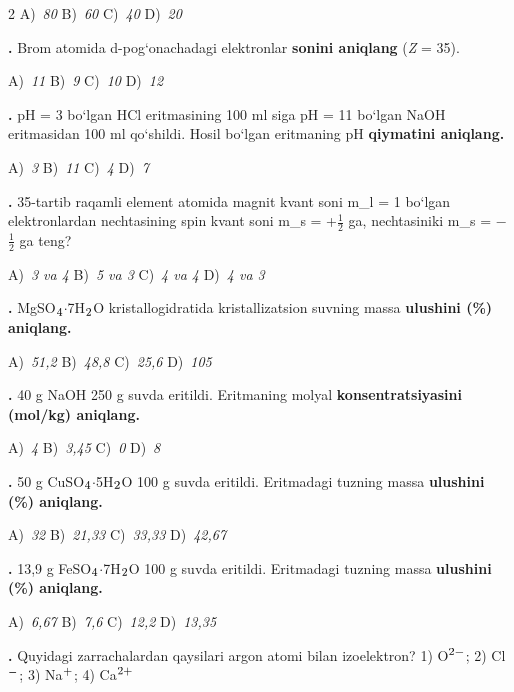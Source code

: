 \documentclass[11pt,a4paper]{article}
\renewcommand{\textsubscript}[1]{\ensuremath{_{\text{\fontsize{8}{8}\selectfont #1}}}}
\renewcommand{\textsuperscript}[1]{\ensuremath{^{\text{\fontsize{8}{8}\selectfont #1}}}}
\newcommand{\qn}[1]{\textbf{\fontsize{11.5}{13}\selectfont #1}}
\newcommand{\qsep}{\par\vspace{1pt}\noindent\rule{0pt}{0.4pt}\par\vspace{5pt}}
\begin{document}
\begin{multicols}{2}
\noindent A)~\textsl{80} \hfill B)~\textsl{60} \hfill C)~\textsl{40} \hfill D)~\textsl{20}\par
\qsep
\noindent\qn{4.} Brom atomida d-pog`onachadagi elektronlar \textbf{sonini aniqlang} (\textit{Z} = 35).

\noindent A)~\textsl{11} \hfill B)~\textsl{9} \hfill C)~\textsl{10} \hfill D)~\textsl{12}\par
\qsep
\noindent\qn{5.} pH = 3 bo`lgan HCl eritmasining 100 ml siga pH = 11 bo`lgan NaOH eritmasidan 100 ml qo`shildi. Hosil bo`lgan eritmaning pH \textbf{qiymatini aniqlang.}

\noindent A)~\textsl{3} \hfill B)~\textsl{11} \hfill C)~\textsl{4} \hfill D)~\textsl{7}\par
\qsep
\noindent\qn{6.} 35-tartib raqamli element atomida magnit kvant soni m\_l = 1 bo`lgan elektronlardan nechtasining spin kvant soni m\_s = +$\frac{1}{2}$ ga, nechtasiniki m\_s = $-$$\frac{1}{2}$ ga teng?

\noindent A)~\textsl{3 va 4} \hfill B)~\textsl{5 va 3} \hfill C)~\textsl{4 va 4} \hfill D)~\textsl{4 va 3}\par
\qsep
\noindent\qn{7.} MgSO\textsubscript{4}$\cdot$7H\textsubscript{2}O kristallogidratida kristallizatsion suvning massa \textbf{ulushini (\%) aniqlang.}

\noindent A)~\textsl{51,2} \hfill B)~\textsl{48,8} \hfill C)~\textsl{25,6} \hfill D)~\textsl{105}\par
\qsep
\noindent\qn{8.} 40 g NaOH 250 g suvda eritildi. Eritmaning molyal \textbf{konsentratsiyasini (mol/kg) aniqlang.}

\noindent A)~\textsl{4} \hfill B)~\textsl{3,45} \hfill C)~\textsl{0} \hfill D)~\textsl{8}\par
\qsep
\noindent\qn{9.} 50 g CuSO\textsubscript{4}$\cdot$5H\textsubscript{2}O 100 g suvda eritildi. Eritmadagi tuzning massa \textbf{ulushini (\%) aniqlang.}

\noindent A)~\textsl{32} \hfill B)~\textsl{21,33} \hfill C)~\textsl{33,33} \hfill D)~\textsl{42,67}\par
\qsep
\noindent\qn{10.} 13,9 g FeSO\textsubscript{4}$\cdot$7H\textsubscript{2}O 100 g suvda eritildi. Eritmadagi tuzning massa \textbf{ulushini (\%) aniqlang.}

\noindent A)~\textsl{6,67} \hfill B)~\textsl{7,6} \hfill C)~\textsl{12,2} \hfill D)~\textsl{13,35}\par
\qsep
\noindent\qn{11.} Quyidagi zarrachalardan qaysilari argon atomi bilan izoelektron? 1) O\textsuperscript{2$-$}; 2) Cl\textsuperscript{$-$}; 3) Na\textsuperscript{+}; 4) Ca\textsuperscript{2+}


\end{multicols}
\end{document}
